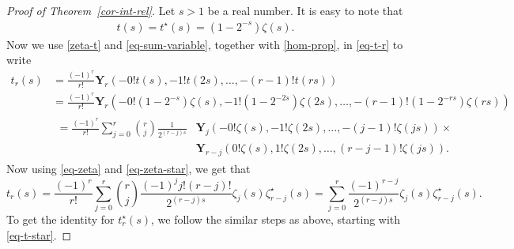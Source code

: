 \documentclass[12pt]{amsart}
\newcommand{\thmref}[1]{Theorem~\ref{#1}}
\begin{document}
\begin{proof}[Proof of \thmref{cor-int-rel}] 
Let $s>1$ be a real number. It is easy to note that
\begin{align}\label{zeta-t}
t(s)=t^{\star}(s)=\left(1-{2^{-s}}\right)\zeta(s).
\end{align}
Now we use \eqref{zeta-t} and \eqref{eq-sum-variable}, together with \eqref{hom-prop}, in \eqref{eq-t-r} to write
\begin{align*}
t_r(s)&= \frac{(-1)^r}{r!}\mathbf{Y}_r\left(-0!t(s), -1!t(2s),\ldots,-(r-1)!t(rs)\right)\\
&=\frac{(-1)^r}{r!}\mathbf{Y}_r\left(-0!(1-2^{-s})\zeta(s), -1!(1-2^{-2s})\zeta(2s),\ldots,-(r-1)!(1-2^{-rs})\zeta(rs)\right)\\
&\begin{aligned}
=\frac{(-1)^r}{r!}
\sum_{j=0}^{r}\binom{r}{j}\frac{1}{2^{(r-j)s}}&\mathbf{Y}_j(-0!\zeta(s), -1!\zeta(2s),\ldots,-(j-1)!\zeta(js))\times \\
&\mathbf{Y}_{r-j}\left(0!{\zeta(s)}, 
1!{\zeta(2s)},\ldots,(r-j-1)!{\zeta(js)}\right).
\end{aligned}
\end{align*}
Now using \eqref{eq-zeta} and \eqref{eq-zeta-star},  we get that
$$
t_r(s)=\frac{(-1)^r}{r!}
\sum_{j=0}^{r}\binom{r}{j}\frac{{(-1)^jj!(r-j)!}}{2^{(r-j)s}}\zeta_j(s)\zeta^{\star}_{r-j}(s)=\sum_{j=0}^{r}\frac{(-1)^{r-j}}{2^{(r-j)s}}\zeta_j(s)\zeta^{\star}_{r-j}(s).
$$
To get the identity for $t^{\star}_r(s)$, we follow the similar steps as above, starting with \eqref{eq-t-star}.
\end{proof}
\end{document}
